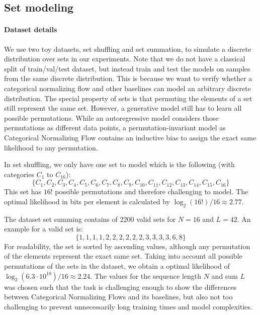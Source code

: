 \subsection{Set modeling}
\label{sec:appendix_hyperparams_set}
\paragraph{Dataset details} We use two toy datasets, set shuffling and set summation, to simulate a discrete distribution over sets in our experiments. Note that we do not have a classical split of train/val/test dataset, but instead train and test the models on samples from the same discrete distribution. This is because we want to verify whether a categorical normalizing flow and other baselines can model an arbitrary discrete distribution. 
The special property of sets is that permuting the elements of a set still represent the same set. However, a generative model still has to learn all possible permutations. While an autoregressive model considers those permutations as different data points, a permutation-invariant model as Categorical Normalizing Flow contains an inductive bias to assign the exact same likelihood to any permutation. 

In set shuffling, we only have one set to model which is the following (with categories $C_{1}$ to $C_{16}$):
$$\{C_{1}, C_{2}, C_{3}, C_{4}, C_{5}, C_{6}, C_{7}, C_{8}, C_{9}, C_{10}, C_{11}, C_{12}, C_{13}, C_{14}, C_{15}, C_{16}\}$$
This set has $16!$ possible permutations and therefore challenging to model. The optimal likelihood in bits per element is calculated by $\log_2 \left(16!\right) / 16 \approx 2.77$. %

The dataset set summing contains of 2200 valid sets for $N=16$ and $L=42$. An example for a valid set is:
$$\{1, 1, 1, 1, 2, 2, 2, 2, 2, 2, 3, 3, 3, 3, 6, 8\}$$
For readability, the set is sorted by ascending values, although any permutation of the elements represent the exact same set. Taking into account all possible permutations of the sets in the dataset, we obtain a optimal likelihood of $\log_2 \left(6.3\cdot10^{10}\right) / 16 \approx 2.24$.
The values for the sequence length $N$ and sum $L$ was chosen such that the task is challenging enough to show the differences between Categorical Normalizing Flows and its baselines, but also not too challenging to prevent unnecessarily long training times and model complexities.

